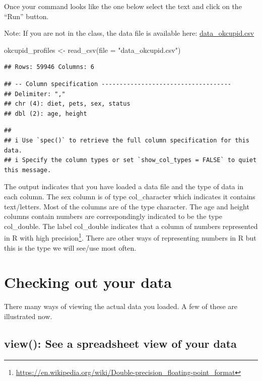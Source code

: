 \documentclass[
]{krantz}
\makeatletter
\newenvironment{Shaded}{\begin{snugshade}}{\end{snugshade}}
\newcommand{\AttributeTok}[1]{\textcolor[rgb]{0.61,0.61,0.61}{#1}}
\newcommand{\FunctionTok}[1]{\textcolor[rgb]{0,0,0}{#1}}
\newcommand{\NormalTok}[1]{#1}
\newcommand{\OtherTok}[1]{\textcolor[rgb]{0.37,0.37,0.37}{#1}}
\newcommand{\StringTok}[1]{\textcolor[rgb]{0.5,0.5,0.5}{#1}}
\renewcommand{\href}[2]{#2\footnote{\url{#1}}}
\newenvironment{kframe}{%
\medskip{}
\setlength{\fboxsep}{.8em}
 \def\at@end@of@kframe{}%
 \ifinner\ifhmode%
  \def\at@end@of@kframe{\end{minipage}}%
  \begin{minipage}{\columnwidth}%
 \fi\fi%
 \def\FrameCommand##1{\hskip\@totalleftmargin \hskip-\fboxsep
 \colorbox{shadecolor}{##1}\hskip-\fboxsep
     \hskip-\linewidth \hskip-\@totalleftmargin \hskip\columnwidth}%
 \MakeFramed {\advance\hsize-\width
   \@totalleftmargin\z@ \linewidth\hsize
   \@setminipage}}%
 {\par\unskip\endMakeFramed%
 \at@end@of@kframe}
\renewenvironment{Shaded}{\begin{kframe}}{\end{kframe}}
\makeatother
\begin{document}
Once your command looks like the one below select the text and click on the ``Run'' button.

Note: If you are not in the class, the data file is available here: \url{data_okcupid.csv}

\begin{Shaded}
\begin{Highlighting}[]
\NormalTok{okcupid\_profiles }\OtherTok{\textless{}{-}} \FunctionTok{read\_csv}\NormalTok{(}\AttributeTok{file =} \StringTok{"data\_okcupid.csv"}\NormalTok{)}
\end{Highlighting}
\end{Shaded}

\begin{verbatim}
## Rows: 59946 Columns: 6
\end{verbatim}

\begin{verbatim}
## -- Column specification ------------------------------------
## Delimiter: ","
## chr (4): diet, pets, sex, status
## dbl (2): age, height
\end{verbatim}

\begin{verbatim}
## 
## i Use `spec()` to retrieve the full column specification for this data.
## i Specify the column types or set `show_col_types = FALSE` to quiet this message.
\end{verbatim}

The output indicates that you have loaded a data file and the type of data in each column. The sex column is of type col\_character which indicates it contains text/letters. Most of the columns are of the type character. The age and height columns contain numbers are correspondingly indicated to be the type col\_double. The label col\_double indicates that a column of numbers represented in R with \href{https://en.wikipedia.org/wiki/Double-precision_floating-point_format}{high precision}. There are other ways of representing numbers in R but this is the type we will see/use most often.

\hypertarget{checking-out-your-data}{%
\section{Checking out your data}\label{checking-out-your-data}}

There many ways of viewing the actual data you loaded. A few of these are illustrated now.

\hypertarget{view-see-a-spreadsheet-view-of-your-data}{%
\subsection{view(): See a spreadsheet view of your data}\label{view-see-a-spreadsheet-view-of-your-data}}
\end{document}
